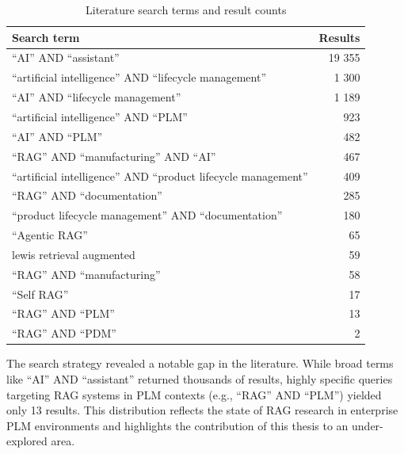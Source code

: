 \begin{table}[htbp]
    \centering
    \begin{tabular}{lr}
        \hline
        \textbf{Search term}                                             & \textbf{Results} \\
        \hline
        ``AI'' AND ``assistant''                                         & 19 355           \\
        ``artificial intelligence'' AND ``lifecycle management''         & 1 300            \\
        ``AI'' AND ``lifecycle management''                              & 1 189            \\
        ``artificial intelligence'' AND ``PLM''                          & 923              \\
        ``AI'' AND ``PLM''                                               & 482              \\
        ``RAG'' AND ``manufacturing'' AND ``AI''                         & 467              \\
        ``artificial intelligence'' AND ``product lifecycle management'' & 409              \\
        ``RAG'' AND ``documentation''                                    & 285              \\
        ``product lifecycle management'' AND ``documentation''           & 180              \\
        ``Agentic RAG''                                                  & 65               \\
        lewis retrieval augmented                                        & 59               \\
        ``RAG'' AND ``manufacturing''                                    & 58               \\
        ``Self RAG''                                                     & 17               \\
        ``RAG'' AND ``PLM''                                              & 13               \\
        ``RAG'' AND ``PDM''                                              & 2                \\
        \hline
    \end{tabular}
    \caption{Literature search terms and result counts}
    \label{tab:search-terms}
\end{table}

The search strategy revealed a notable gap in the literature. While broad terms like ``AI'' AND ``assistant'' returned thousands of results, highly specific queries targeting RAG systems in PLM contexts (e.g., ``RAG'' AND ``PLM'') yielded only 13 results. This distribution reflects the state of RAG research in enterprise PLM environments and highlights the contribution of this thesis to an under-explored area.

